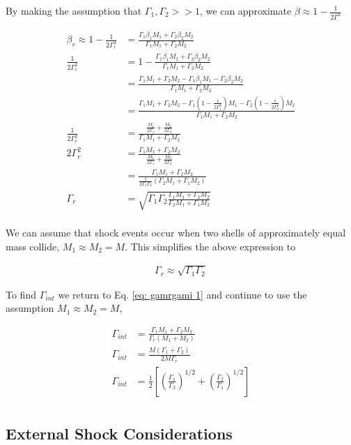 \documentclass[linenumbers,twocolumn]{aastex631}
\begin{document}
\begin{appendix}
By making the assumption that $\Gamma_1, \Gamma_2 >> 1$, we can approximate $\beta \approx 1-\frac{1}{2\Gamma^2}$

\begin{align}
	\beta_r \approx 1-\frac{1}{2\Gamma_r^2} &= \frac{\Gamma_1\beta_1M_1+\Gamma_2\beta_2M_2}{\Gamma_1M_1 + \Gamma_2M_2} \\
	\frac{1}{2\Gamma_r^2} &= 1 - \frac{\Gamma_1\beta_1M_1+\Gamma_2\beta_2M_2}{\Gamma_1M_1 + \Gamma_2M_2} \\ 
	&= \frac{\Gamma_1M_1 + \Gamma_2M_2 - \Gamma_1\beta_1M_1 - \Gamma_2\beta_2M_2 }{\Gamma_1M_1 + \Gamma_2M_2} \\
	&= \frac{\Gamma_1M_1 + \Gamma_2M_2 - \Gamma_1(1-\frac{1}{2\Gamma_1^2})M_1 - \Gamma_2(1-\frac{1}{2\Gamma_2^2})M_2 }{\Gamma_1M_1 + \Gamma_2M_2} \\
	\frac{1}{2\Gamma_r^2} &= \frac{\frac{M_1}{2\Gamma_1} + \frac{M_2}{2\Gamma_2}}{\Gamma_1M_1 + \Gamma_2M_2} \\
	2\Gamma_r^2 &= \frac{\Gamma_1M_1 + \Gamma_2M_2}{\frac{M_1}{2\Gamma_1} + \frac{M_2}{2\Gamma_2}} \\
	&= \frac{\Gamma_1M_1 + \Gamma_2M_2}{\frac{1}{2\Gamma_1\Gamma_2}(\Gamma_2M_1 + \Gamma_1M_2)} \\
	\Gamma_r &= \sqrt{\Gamma_1\Gamma_2\frac{\Gamma_1M_1 + \Gamma_2M_2}{\Gamma_2M_1 + \Gamma_1M_2}} \\
\end{align}

We can assume that shock events occur when two shells of approximately equal mass collide, $M_1 \approx M_2 = M$. This simplifies the above expression to

\begin{align}
	\Gamma_r \approx \sqrt{\Gamma_1\Gamma_2}
\end{align}

To find $\Gamma_{int}$ we return to Eq. \ref{eq: gamrgami 1} and continue to use the assumption $M_1 \approx M_2 = M$, 

\begin{align}
	\Gamma_{int} &= \frac{\Gamma_1M_1 + \Gamma_2M_2}{\Gamma_r(M_1+M_2)}\\
	\Gamma_{int} &= \frac{M(\Gamma_1 + \Gamma_2)}{2M\Gamma_r}\\
	\Gamma_{int} &= \frac{1}{2}\left[ \left(\frac{\Gamma_1}{\Gamma_2}\right)^{1/2} + \left(\frac{\Gamma_2}{\Gamma_1}\right)^{1/2}\right]\\
\end{align}

\subsection{External Shock Considerations}


\end{appendix}
\end{document}
